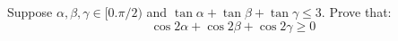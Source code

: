 Suppose $\alpha,\beta,\gamma \in [0.\pi/2)$ and $\tan \alpha + \tan\beta + \tan \gamma \leq 3$.
Prove that:
\[\cos 2\alpha + \cos 2\beta + \cos 2\gamma \ge 0\]

